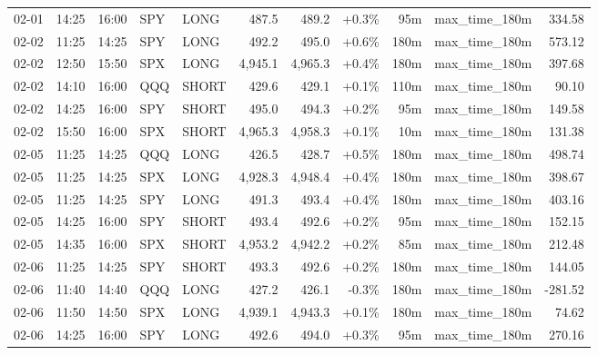 \documentclass[11pt,a4paper,twoside]{article}
\begin{document}
\begin{center}
\begin{longtable}{>{\color{txtmain}}l l l l l r r r r >{\color{txtmain}}l r}
02-01 & 14:25 & 16:00 & SPY & LONG & 487.5 & 489.2 & \textcolor{wingreen}{+0.3\%} & 95m & max\_time\_180m & \textcolor{wingreen}{334.58} \\
02-02 & 11:25 & 14:25 & SPY & LONG & 492.2 & 495.0 & \textcolor{wingreen}{+0.6\%} & 180m & max\_time\_180m & \textcolor{wingreen}{573.12} \\
02-02 & 12:50 & 15:50 & SPX & LONG & 4,945.1 & 4,965.3 & \textcolor{wingreen}{+0.4\%} & 180m & max\_time\_180m & \textcolor{wingreen}{397.68} \\
02-02 & 14:10 & 16:00 & QQQ & SHORT & 429.6 & 429.1 & \textcolor{wingreen}{+0.1\%} & 110m & max\_time\_180m & \textcolor{wingreen}{90.10} \\
02-02 & 14:25 & 16:00 & SPY & SHORT & 495.0 & 494.3 & \textcolor{wingreen}{+0.2\%} & 95m & max\_time\_180m & \textcolor{wingreen}{149.58} \\
02-02 & 15:50 & 16:00 & SPX & SHORT & 4,965.3 & 4,958.3 & \textcolor{wingreen}{+0.1\%} & 10m & max\_time\_180m & \textcolor{wingreen}{131.38} \\
02-05 & 11:25 & 14:25 & QQQ & LONG & 426.5 & 428.7 & \textcolor{wingreen}{+0.5\%} & 180m & max\_time\_180m & \textcolor{wingreen}{498.74} \\
02-05 & 11:25 & 14:25 & SPX & LONG & 4,928.3 & 4,948.4 & \textcolor{wingreen}{+0.4\%} & 180m & max\_time\_180m & \textcolor{wingreen}{398.67} \\
02-05 & 11:25 & 14:25 & SPY & LONG & 491.3 & 493.4 & \textcolor{wingreen}{+0.4\%} & 180m & max\_time\_180m & \textcolor{wingreen}{403.16} \\
02-05 & 14:25 & 16:00 & SPY & SHORT & 493.4 & 492.6 & \textcolor{wingreen}{+0.2\%} & 95m & max\_time\_180m & \textcolor{wingreen}{152.15} \\
02-05 & 14:35 & 16:00 & SPX & SHORT & 4,953.2 & 4,942.2 & \textcolor{wingreen}{+0.2\%} & 85m & max\_time\_180m & \textcolor{wingreen}{212.48} \\
02-06 & 11:25 & 14:25 & SPY & SHORT & 493.3 & 492.6 & \textcolor{wingreen}{+0.2\%} & 180m & max\_time\_180m & \textcolor{wingreen}{144.05} \\
02-06 & 11:40 & 14:40 & QQQ & LONG & 427.2 & 426.1 & \textcolor{lossred}{-0.3\%} & 180m & max\_time\_180m & \textcolor{lossred}{-281.52} \\
02-06 & 11:50 & 14:50 & SPX & LONG & 4,939.1 & 4,943.3 & \textcolor{wingreen}{+0.1\%} & 180m & max\_time\_180m & \textcolor{wingreen}{74.62} \\
02-06 & 14:25 & 16:00 & SPY & LONG & 492.6 & 494.0 & \textcolor{wingreen}{+0.3\%} & 95m & max\_time\_180m & \textcolor{wingreen}{270.16} \\

\end{longtable}
\end{center}
\end{document}
